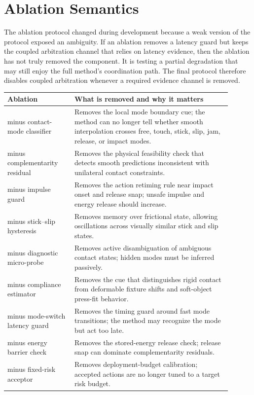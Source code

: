 \documentclass{article}
\begin{document}
\clearpage
\section{Ablation Semantics}
The ablation protocol changed during development because a weak version of the protocol exposed an ambiguity. If an ablation removes a latency guard but keeps the coupled arbitration channel that relies on latency evidence, then the ablation has not truly removed the component. It is testing a partial degradation that may still enjoy the full method's coordination path. The final protocol therefore disables coupled arbitration whenever a required evidence channel is removed.

\begin{longtable}{p{0.27\linewidth}p{0.63\linewidth}}
\toprule
Ablation & What is removed and why it matters \\
\midrule
minus contact-mode classifier & Removes the local mode boundary cue; the method can no longer tell whether smooth interpolation crosses free, touch, stick, slip, jam, release, or impact modes. \\
minus complementarity residual & Removes the physical feasibility check that detects smooth predictions inconsistent with unilateral contact constraints. \\
minus impulse guard & Removes the action retiming rule near impact onset and release snap; unsafe impulse and energy release should increase. \\
minus stick--slip hysteresis & Removes memory over frictional state, allowing oscillations across visually similar stick and slip states. \\
minus diagnostic micro-probe & Removes active disambiguation of ambiguous contact states; hidden modes must be inferred passively. \\
minus compliance estimator & Removes the cue that distinguishes rigid contact from deformable fixture shifts and soft-object press-fit behavior. \\
minus mode-switch latency guard & Removes the timing guard around fast mode transitions; the method may recognize the mode but act too late. \\
minus energy barrier check & Removes the stored-energy release check; release snap can dominate complementarity residuals. \\
minus fixed-risk acceptor & Removes deployment-budget calibration; accepted actions are no longer tuned to a target risk budget. \\
\bottomrule
\end{longtable}
\end{document}

